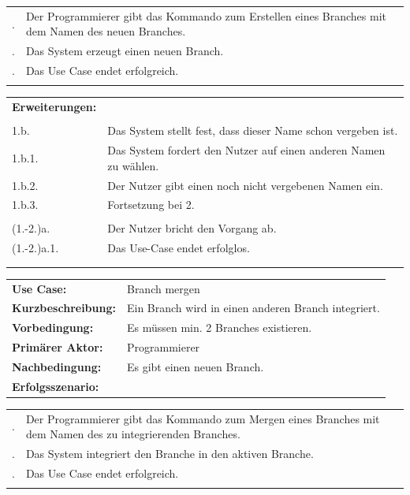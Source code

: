 \documentclass[a4paper]{article}
\begin{document}
\begin{tabularx}{\textwidth}{lX}
\\
\qquad 1. & Der Programmierer gibt das Kommando zum Erstellen eines Branches mit dem Namen des neuen Branches.\\
\qquad 2. & Das System erzeugt einen neuen Branch.\\
\qquad 3. & Das Use Case endet erfolgreich.\\\\\hline
\end{tabularx}

\begin{tabularx}{\textwidth}{lX}
\textbf{Erweiterungen:}\\\\
\qquad \qquad 1.b. & Das System stellt fest, dass dieser Name schon vergeben ist.\\
\qquad \qquad 1.b.1. & Das System fordert den Nutzer auf einen anderen Namen zu wählen.\\
\qquad \qquad 1.b.2. & Der Nutzer gibt einen noch nicht vergebenen Namen ein.\\
\qquad \qquad 1.b.3. & Fortsetzung bei 2.\\\\
\qquad \qquad (1.-2.)a. & Der Nutzer bricht den Vorgang ab.\\
\qquad \qquad (1.-2.)a.1. & Das Use-Case endet erfolglos.\\\\\hline\hline\\
\end{tabularx}


\begin{tabularx}{\textwidth}{lX}
\textbf{Use Case:} & Branch mergen\\
\textbf{Kurzbeschreibung:} & Ein Branch wird in einen anderen Branch integriert.\\
\textbf{Vorbedingung:} & Es müssen min. 2 Branches existieren.\\
\textbf{Primärer Aktor:} & Programmierer\\
\textbf{Nachbedingung:}	& Es gibt einen neuen Branch.\\
\textbf{Erfolgsszenario:} &
\end{tabularx}

\begin{tabularx}{\textwidth}{lX}
\\
\qquad 1. & Der Programmierer gibt das Kommando zum Mergen eines Branches mit dem Namen des zu integrierenden Branches.\\
\qquad 2. & Das System integriert den Branche in den aktiven Branche.\\
\qquad 3. & Das Use Case endet erfolgreich.\\\\\hline
\end{tabularx}
\end{document}
